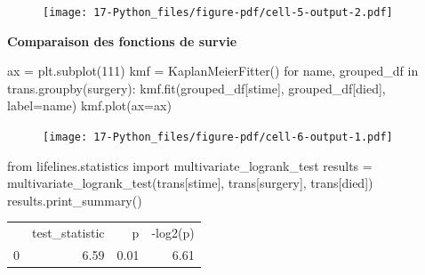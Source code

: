 \documentclass[
  12pt,
  letterpaper,
  DIV=11,
  numbers=noendperiod,
  onepage,
  openany]{scrreprt}
\newenvironment{Shaded}{\begin{snugshade}}{\end{snugshade}}
\newcommand{\ControlFlowTok}[1]{\textcolor[rgb]{0.94,0.87,0.69}{#1}}
\newcommand{\DecValTok}[1]{\textcolor[rgb]{0.86,0.86,0.80}{#1}}
\newcommand{\ImportTok}[1]{\textcolor[rgb]{0.80,0.80,0.80}{#1}}
\newcommand{\KeywordTok}[1]{\textcolor[rgb]{0.94,0.87,0.69}{#1}}
\newcommand{\NormalTok}[1]{\textcolor[rgb]{0.80,0.80,0.80}{#1}}
\newcommand{\OperatorTok}[1]{\textcolor[rgb]{0.94,0.94,0.82}{#1}}
\newcommand{\StringTok}[1]{\textcolor[rgb]{0.80,0.58,0.58}{#1}}
\begin{document}
\begin{figure}[H]

{\centering \texttt{[image: 17-Python\_files/figure-pdf/cell-5-output-2.pdf]}

}

\end{figure}

\textbf{Comparaison des fonctions de survie}

\begin{Shaded}
\begin{Highlighting}[]
\NormalTok{ax }\OperatorTok{=}\NormalTok{ plt.subplot(}\DecValTok{111}\NormalTok{)}
\NormalTok{kmf }\OperatorTok{=}\NormalTok{ KaplanMeierFitter()}
\ControlFlowTok{for}\NormalTok{ name, grouped\_df }\KeywordTok{in}\NormalTok{ trans.groupby(}\StringTok{\textquotesingle{}surgery\textquotesingle{}}\NormalTok{):}
\NormalTok{    kmf.fit(grouped\_df[}\StringTok{\textquotesingle{}stime\textquotesingle{}}\NormalTok{], grouped\_df[}\StringTok{\textquotesingle{}died\textquotesingle{}}\NormalTok{], label}\OperatorTok{=}\NormalTok{name)}
\NormalTok{    kmf.plot(ax}\OperatorTok{=}\NormalTok{ax)}
\end{Highlighting}
\end{Shaded}

\begin{figure}[H]

{\centering \texttt{[image: 17-Python\_files/figure-pdf/cell-6-output-1.pdf]}

}

\end{figure}

\begin{Shaded}
\begin{Highlighting}[]
\ImportTok{from}\NormalTok{ lifelines.statistics }\ImportTok{import}\NormalTok{ multivariate\_logrank\_test}
\NormalTok{results }\OperatorTok{=}\NormalTok{ multivariate\_logrank\_test(trans[}\StringTok{\textquotesingle{}stime\textquotesingle{}}\NormalTok{], trans[}\StringTok{\textquotesingle{}surgery\textquotesingle{}}\NormalTok{], trans[}\StringTok{\textquotesingle{}died\textquotesingle{}}\NormalTok{])}
\NormalTok{results.print\_summary()}
\end{Highlighting}
\end{Shaded}

\begin{tabular}{lrrr}
 & test_statistic & p & -log2(p) \\
0 & 6.59 & 0.01 & 6.61 \\
\end{tabular}
\end{document}
